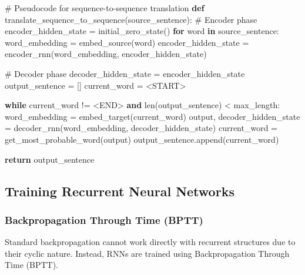 \documentclass[
  letterpaper,
  DIV=11,
  numbers=noendperiod]{scrreprt}
\newenvironment{Shaded}{\begin{snugshade}}{\end{snugshade}}
\newcommand{\BuiltInTok}[1]{\textcolor[rgb]{0.00,0.23,0.31}{#1}}
\newcommand{\CommentTok}[1]{\textcolor[rgb]{0.37,0.37,0.37}{#1}}
\newcommand{\ControlFlowTok}[1]{\textcolor[rgb]{0.00,0.23,0.31}{\textbf{#1}}}
\newcommand{\KeywordTok}[1]{\textcolor[rgb]{0.00,0.23,0.31}{\textbf{#1}}}
\newcommand{\NormalTok}[1]{\textcolor[rgb]{0.00,0.23,0.31}{#1}}
\newcommand{\OperatorTok}[1]{\textcolor[rgb]{0.37,0.37,0.37}{#1}}
\newcommand{\StringTok}[1]{\textcolor[rgb]{0.13,0.47,0.30}{#1}}
\begin{document}
\begin{Shaded}
\begin{Highlighting}[]
\CommentTok{\# Pseudocode for sequence{-}to{-}sequence translation}
\KeywordTok{def}\NormalTok{ translate\_sequence\_to\_sequence(source\_sentence):}
    \CommentTok{\# Encoder phase}
\NormalTok{    encoder\_hidden\_state }\OperatorTok{=}\NormalTok{ initial\_zero\_state()}
    \ControlFlowTok{for}\NormalTok{ word }\KeywordTok{in}\NormalTok{ source\_sentence:}
\NormalTok{        word\_embedding }\OperatorTok{=}\NormalTok{ embed\_source(word)}
\NormalTok{        encoder\_hidden\_state }\OperatorTok{=}\NormalTok{ encoder\_rnn(word\_embedding, encoder\_hidden\_state)}
    
    \CommentTok{\# Decoder phase}
\NormalTok{    decoder\_hidden\_state }\OperatorTok{=}\NormalTok{ encoder\_hidden\_state}
\NormalTok{    output\_sentence }\OperatorTok{=}\NormalTok{ []}
\NormalTok{    current\_word }\OperatorTok{=} \StringTok{\textquotesingle{}\textless{}START\textgreater{}\textquotesingle{}}
    
    \ControlFlowTok{while}\NormalTok{ current\_word }\OperatorTok{!=} \StringTok{\textquotesingle{}\textless{}END\textgreater{}\textquotesingle{}} \KeywordTok{and} \BuiltInTok{len}\NormalTok{(output\_sentence) }\OperatorTok{\textless{}}\NormalTok{ max\_length:}
\NormalTok{        word\_embedding }\OperatorTok{=}\NormalTok{ embed\_target(current\_word)}
\NormalTok{        output, decoder\_hidden\_state }\OperatorTok{=}\NormalTok{ decoder\_rnn(word\_embedding, decoder\_hidden\_state)}
\NormalTok{        current\_word }\OperatorTok{=}\NormalTok{ get\_most\_probable\_word(output)}
\NormalTok{        output\_sentence.append(current\_word)}
    
    \ControlFlowTok{return}\NormalTok{ output\_sentence}
\end{Highlighting}
\end{Shaded}

\subsection{Training Recurrent Neural
Networks}\label{training-recurrent-neural-networks}

\subsubsection{Backpropagation Through Time
(BPTT)}\label{backpropagation-through-time-bptt}

Standard backpropagation cannot work directly with recurrent structures
due to their cyclic nature. Instead, RNNs are trained using
Backpropagation Through Time (BPTT).
\end{document}
